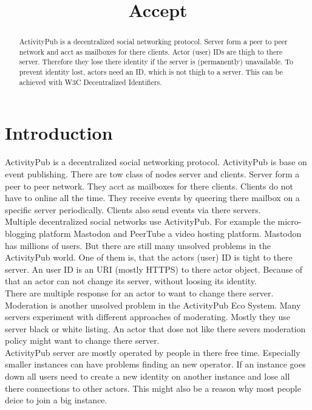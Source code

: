 \documentclass[conference]{IEEEtran}
\begin{document}
\title{Accept}
\author{}
\maketitle
\begin{abstract}
    ActivityPub is a decentralized social networking protocol. Server form a peer to peer network and acct as mailboxes for there clients. Actor (user) IDs are thigh to there server. Therefore they lose there identity if the server is (permanently) unavailable.
    To prevent identity lost, actors need an ID, which is not thigh to a server.
    This can be achieved with W3C Decentralized Identifiers.
\end{abstract}
\section{Introduction}
ActivityPub is a decentralized social networking protocol. ActivityPub is base on event publishing. There are tow class of nodes server and clients. Server form a peer to peer network. They acct as mailboxes for there clients. Clients do not have to online all the time. They receive events by queering there mailbox on a specific server periodically. Clients also send events via there servers.\\
Multiple decentralized social networks use ActivityPub. For example the micro-blogging platform Mastodon and PeerTube a video hosting platform. Mastodon has millions of users. But there are still many unsolved problems in the ActivityPub world. One of them is, that the actors (user) ID is tight to there server. An user ID is an URI (mostly HTTPS) to there actor object. Because of that an actor can not change its server, without loosing its identity.\\
There are multiple response for an actor to want to change there server. Moderation is another unsolved problem in the ActivityPub Eco System. Many servers experiment with different approaches of moderating. Mostly they use server black or white listing. An actor that dose not like there severs moderation policy might want to change there server.\\
ActivityPub server are mostly operated by people in there free time. Especially smaller instances can have problems finding an new operator. If an instance goes down all users need to create a new identity on another instance and lose all there connections to other actors. This might also be a reason why most people deice to join a big instance.\\
\end{document}
